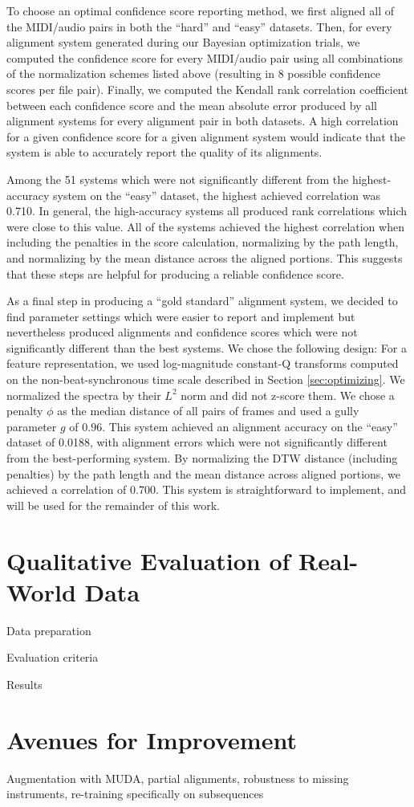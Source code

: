 \documentclass{article}
\begin{document}
To choose an optimal confidence score reporting method, we first aligned all of the MIDI/audio pairs in both the ``hard'' and ``easy'' datasets.
Then, for every alignment system generated during our Bayesian optimization trials, we computed the confidence score for every MIDI/audio pair using all combinations of the normalization schemes listed above (resulting in 8 possible confidence scores per file pair).
Finally, we computed the Kendall rank correlation coefficient \cite{kendall1938new} between each confidence score and the mean absolute error produced by all alignment systems for every alignment pair in both datasets.
A high correlation for a given confidence score for a given alignment system would indicate that the system is able to accurately report the quality of its alignments.

Among the 51 systems which were not significantly different from the highest-accuracy system on the ``easy'' dataset, the highest achieved correlation was 0.710.
In general, the high-accuracy systems all produced rank correlations which were close to this value.
All of the systems achieved the highest correlation when including the penalties in the score calculation, normalizing by the path length, and normalizing by the mean distance across the aligned portions.
This suggests that these steps are helpful for producing a reliable confidence score.

As a final step in producing a ``gold standard'' alignment system, we decided to find parameter settings which were easier to report and implement but nevertheless produced alignments and confidence scores which were not significantly different than the best systems.
We chose the following design: For a feature representation, we used log-magnitude constant-Q transforms computed on the non-beat-synchronous time scale described in Section \ref{sec:optimizing}.
We normalized the spectra by their $L^2$ norm and did not z-score them.
We chose a penalty $\phi$ as the median distance of all pairs of frames and used a gully parameter $g$ of $0.96$.
This system achieved an alignment accuracy on the ``easy'' dataset of 0.0188, with alignment errors which were not significantly different from the best-performing system.
By normalizing the DTW distance (including penalties) by the path length and the mean distance across aligned portions, we achieved a correlation of 0.700.
This system is straightforward to implement, and will be used for the remainder of this work.

\section{Qualitative Evaluation of Real-World Data}
\label{sec:qualitative}


Data preparation

Evaluation criteria

Results

\section{Avenues for Improvement}
\label{sec:avenues}

Augmentation with MUDA, partial alignments, robustness to missing instruments, re-training specifically on subsequences



\end{document}
